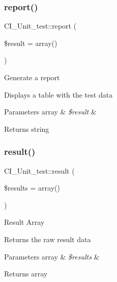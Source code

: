 \subsubsection{\texorpdfstring{report()}{report()}}
{\footnotesize\ttfamily C\+I\+\_\+\+Unit\+\_\+test\+::report (\begin{DoxyParamCaption}\item[{}]{\$result = {\ttfamily array()} }\end{DoxyParamCaption})}

Generate a report

Displays a table with the test data


\begin{DoxyParams}[1]{Parameters}
array & {\em \$result} & \\
\hline
\end{DoxyParams}
\begin{DoxyReturn}{Returns}
string 
\end{DoxyReturn}
\mbox{\label{class_c_i___unit__test_abbf6e7425a54cb379268cd5f71b478b6}} 
\subsubsection{\texorpdfstring{result()}{result()}}
{\footnotesize\ttfamily C\+I\+\_\+\+Unit\+\_\+test\+::result (\begin{DoxyParamCaption}\item[{}]{\$results = {\ttfamily array()} }\end{DoxyParamCaption})}

Result Array

Returns the raw result data


\begin{DoxyParams}[1]{Parameters}
array & {\em \$results} & \\
\hline
\end{DoxyParams}
\begin{DoxyReturn}{Returns}
array 
\end{DoxyReturn}
\mbox{\label{class_c_i___unit__test_adf0dafbc83a2de7807a255bd95706798}} 
